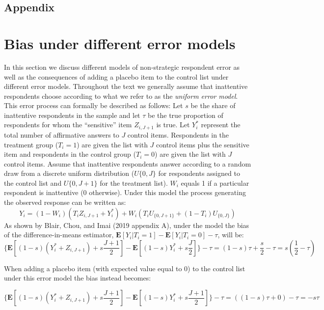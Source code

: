\documentclass[]{article}
\begin{document}
\hypertarget{appendix}{%
\subsection{Appendix}\label{appendix}}

\hypertarget{bias-under-different-error-models}{%
\section{Bias under different error
models}\label{bias-under-different-error-models}}

In this section we discuss different models of non-strategic respondent
error as well as the consequences of adding a placebo item to the
control list under different error models. Throughout the text we
generally assume that inattentive respondents choose according to what
we refer to as the \emph{uniform error model}. This error process can
formally be described as follows: Let \(s\) be the share of inattentive
respondents in the sample and let \(\tau\) be the true proportion of
respondents for whom the ``sensitive'' item \(Z_{i, J+1}\) is true. Let
\(Y^*_{i}\) represent the total number of affirmative answers to \(J\)
control items. Respondents in the treatment group (\(T_{i}=1\)) are
given the list with \(J\) control items plus the sensitive item and
respondents in the control group (\(T_{i}=0\)) are given the list with
\(J\) control items. Assume that inattentive respondents answer
according to a random draw from a discrete uniform distribution
(\(U\{0,J\}\) for respondents assigned to the control list and
\(U\{0,J+1\}\) for the treatment list). \(W_{i}\) equals 1 if a
particular respondent is inattentive (0 otherwise). Under this model the
process generating the observed response can be written as: \[
Y_{i} = (1-W_{i})(T_{i}Z_{i, J+1}+Y^*_{i})+W_{i}(T_{i}U_{\{0,J+1\}}+(1-T_{i})U_{\{0,J\}})
\] As shown by Blair, Chou, and Imai (2019 appendix A), under the model
the bias of the difference-in-means estimator,
\(\mathbf{E}[Y_{i}|T_{i}=1] - \mathbf{E}[Y_{i}|T_{i}=0] - \tau\), will
be: \[
\bigg\{ \mathbf{E} \left[ (1-s)(Y^*_{i} + Z_{i, J+1}) + s \frac{J+1}{2} \right] - \mathbf{E} \left[ (1-s)Y^*_{i} + s \frac{J}{2} \right] \bigg\} - \tau = (1-s) \tau + \frac{s}{2} - \tau = s \left(\frac{1}{2} - \tau \right)
\]

When adding a placebo item (with expected value equal to 0) to the
control list under this error model the bias instead becomes:

\[
\bigg\{ \mathbf{E} \left[ (1-s)(Y^*_{i} + Z_{i, J+1}) + s \frac{J+1}{2} \right] - \mathbf{E} \left[ (1-s)Y^*_{i} + s \frac{J+1}{2} \right] \bigg\} - \tau = \left( (1-s) \tau + 0 \right) - \tau = -s \tau
\]
\end{document}
